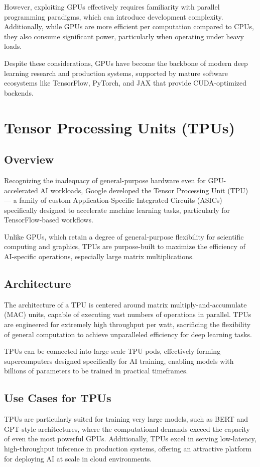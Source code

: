 \documentclass[openany]{book}
\begin{document}
However, exploiting GPUs effectively requires familiarity with parallel 
programming paradigms, which can introduce development complexity. Additionally,
while GPUs are more efficient per computation compared to CPUs, they also 
consume significant power, particularly when operating under heavy loads.

Despite these considerations, GPUs have become the backbone of modern deep 
learning research and production systems, supported by mature software 
ecosystems like TensorFlow, PyTorch, and JAX that provide CUDA-optimized 
backends.

\section{Tensor Processing Units (TPUs)}

\subsection{Overview}
Recognizing the inadequacy of general-purpose hardware even for GPU-accelerated 
AI workloads, Google developed the Tensor Processing Unit (TPU) — a family of 
custom Application-Specific Integrated Circuits (ASICs) specifically designed to 
accelerate machine learning tasks, particularly for TensorFlow-based workflows.

Unlike GPUs, which retain a degree of general-purpose flexibility for scientific 
computing and graphics, TPUs are purpose-built to maximize the efficiency of 
AI-specific operations, especially large matrix multiplications.

\subsection{Architecture}
The architecture of a TPU is centered around matrix multiply-and-accumulate 
(MAC) units, capable of executing vast numbers of operations in parallel. TPUs 
are engineered for extremely high throughput per watt, sacrificing the 
flexibility of general computation to achieve unparalleled efficiency for deep 
learning tasks.

TPUs can be connected into large-scale TPU pods, effectively forming 
supercomputers designed specifically for AI training, enabling models with 
billions of parameters to be trained in practical timeframes.

\subsection{Use Cases for TPUs}
TPUs are particularly suited for training very large models, such as BERT and 
GPT-style architectures, where the computational demands exceed the capacity of 
even the most powerful GPUs. Additionally, TPUs excel in serving low-latency, 
high-throughput inference in production systems, offering an attractive platform 
for deploying AI at scale in cloud environments.
\end{document}
